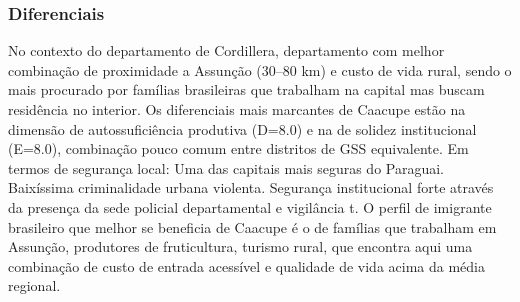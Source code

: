 \subsubsection*{Diferenciais}\label{dif-caacupe-0301}
No contexto do departamento de Cordillera, departamento com melhor combinação de proximidade a Assunção (30–80 km) e custo de vida rural, sendo o mais procurado por famílias brasileiras que trabalham na capital mas buscam residência no interior. Os diferenciais mais marcantes de Caacupe estão na dimensão de autossuficiência produtiva (D=8.0) e na de solidez institucional (E=8.0), combinação pouco comum entre distritos de GSS equivalente. Em termos de segurança local: Uma das capitais mais seguras do Paraguai. Baixíssima criminalidade urbana violenta. Segurança institucional forte através da presença da sede policial departamental e vigilância t. O perfil de imigrante brasileiro que melhor se beneficia de Caacupe é o de famílias que trabalham em Assunção, produtores de fruticultura, turismo rural, que encontra aqui uma combinação de custo de entrada acessível e qualidade de vida acima da média regional.
